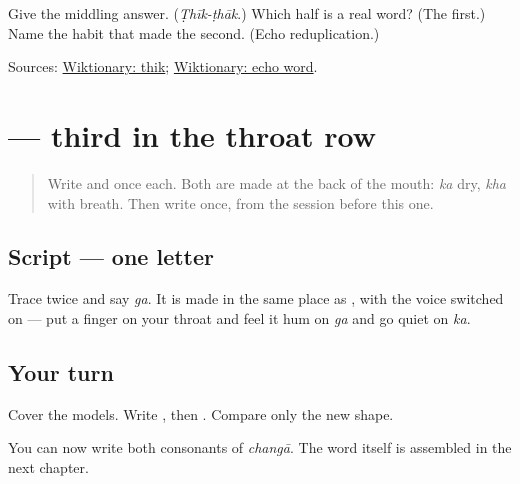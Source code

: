 \begin{tcolorbox}[breakable,colback=teal!4,colframe=teal!35!black,title={Before you move on}]
Give the middling answer. (\emph{Ṭhīk-ṭhāk}.) Which half is a real word? (The first.) Name the habit that made the second. (Echo reduplication.)

Sources: \href{https://en.wiktionary.org/wiki/\%E0\%A8\%A0\%E0\%A9\%80\%E0\%A8\%95}{Wiktionary: thik}; \href{https://en.wiktionary.org/wiki/echo\_word}{Wiktionary: echo word}.
\end{tcolorbox}
\section[\texorpdfstring{\pa{ਗ} (ga)}{ਗ (ga)}]{ — third in the throat row}

\label{lesson:PA-W09-gagga}



\begin{quote}
Write \textbf{} and \textbf{} once each. Both are made at the back of the mouth: \emph{ka} dry, \emph{kha} with breath. Then write \textbf{} once, from the session before this one.
\end{quote}

\subsection*{Script — one letter}

Trace \textbf{} twice and say \emph{ga}. It is made in the same place as \textbf{}, with the voice switched on — put a finger on your throat and feel it hum on \emph{ga} and go quiet on \emph{ka}.

\subsection*{Your turn}
Cover the models. Write \textbf{}, then \textbf{}. Compare only the new shape.

\begin{tcolorbox}[breakable,colback=teal!4,colframe=teal!35!black,title={Before you move on}]
You can now write both consonants of \emph{changā}. The word itself is assembled in the next chapter.
\end{tcolorbox}
